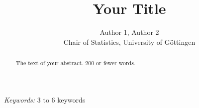 \begin{titlepage}

\title{\bf Your Title}

\author{Author 1, Author 2 \hspace{.2cm}\\ Chair of Statistics, University of G\"ottingen\\}

\maketitle

\bigskip

\begin{abstract}
    The text of your abstract.  200 or fewer words.
\end{abstract}

\noindent%
    {\it Keywords:}  3 to 6 keywords
\vfill

\end{titlepage}
